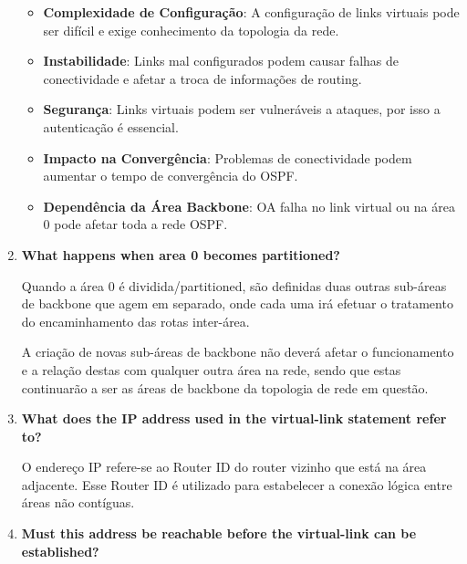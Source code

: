 \documentclass[11pt,english, openright, oneside]{book}
\begin{document}
\begin{enumerate}
  \begin{itemize}
    \item \textbf{Complexidade de Configuração}: A configuração de links virtuais pode ser difícil e exige conhecimento da topologia da rede.
    \item \textbf{Instabilidade}: Links mal configurados podem causar falhas de conectividade e afetar a troca de informações de routing.
    \item \textbf{Segurança}: Links virtuais podem ser vulneráveis a ataques, por isso a autenticação é essencial.
    \item \textbf{Impacto na Convergência}: Problemas de conectividade podem aumentar o tempo de convergência do OSPF.
    \item \textbf{Dependência da Área Backbone}: OA falha no link virtual ou na área 0 pode afetar toda a rede OSPF.
  \end{itemize}
  \vspace{0.2cm}

  \item \textbf{What happens when area 0 becomes partitioned?}
  \vspace{0.2cm}

  \par Quando a área 0 é dividida/partitioned, são definidas duas outras sub-áreas de backbone que agem em separado, onde cada uma irá efetuar o tratamento do encaminhamento das rotas inter-área.
  \vspace{0.2cm}

  \par A criação de novas sub-áreas de backbone não deverá afetar o funcionamento e a relação destas com qualquer outra área na rede, sendo que estas continuarão a ser as áreas de backbone da topologia de rede em questão.
  \vspace{0.2cm}

  \item \textbf{What does the IP address used in the virtual-link statement refer to?}
  \vspace{0.2cm}

  \par O endereço IP refere-se ao Router ID do router vizinho que está na área adjacente. Esse Router ID é utilizado para estabelecer a conexão lógica entre áreas não contíguas.
  \vspace{0.2cm}

  \item \textbf{Must this address be reachable before the virtual-link can be established?}
  \vspace{0.2cm}


\end{enumerate}
\end{document}

